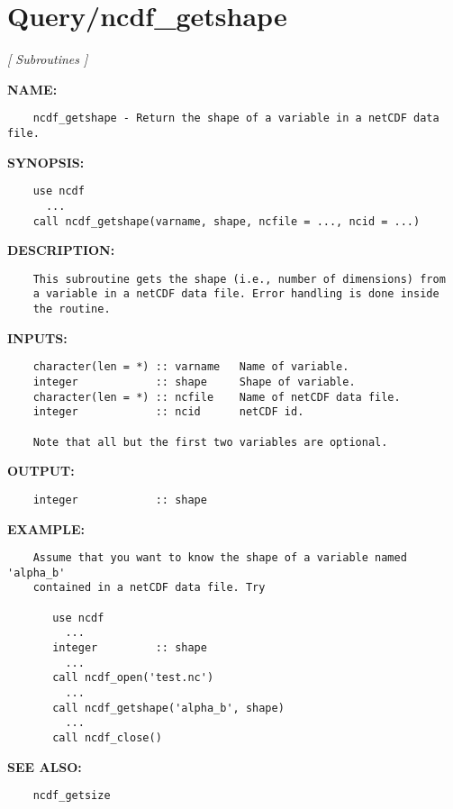 \section{Query/ncdf\_getshape}
\textsl{[ Subroutines ]}

\label{ch:robo93}
\label{ch:Query_ncdf_getshape}
\textbf{NAME:}\hspace{0.08in}\begin{Verbatim}
    ncdf_getshape - Return the shape of a variable in a netCDF data file.
\end{Verbatim}
\textbf{SYNOPSIS:}\hspace{0.08in}\begin{Verbatim}
    use ncdf
      ...
    call ncdf_getshape(varname, shape, ncfile = ..., ncid = ...)
\end{Verbatim}
\textbf{DESCRIPTION:}\hspace{0.08in}\begin{Verbatim}
    This subroutine gets the shape (i.e., number of dimensions) from
    a variable in a netCDF data file. Error handling is done inside
    the routine.
\end{Verbatim}
\textbf{INPUTS:}\hspace{0.08in}\begin{Verbatim}
    character(len = *) :: varname   Name of variable.
    integer            :: shape     Shape of variable.
    character(len = *) :: ncfile    Name of netCDF data file.
    integer            :: ncid      netCDF id.

    Note that all but the first two variables are optional.
\end{Verbatim}
\textbf{OUTPUT:}\hspace{0.08in}\begin{Verbatim}
    integer            :: shape
\end{Verbatim}
\textbf{EXAMPLE:}\hspace{0.08in}\begin{Verbatim}
    Assume that you want to know the shape of a variable named 'alpha_b'
    contained in a netCDF data file. Try

       use ncdf
         ...
       integer         :: shape
         ...
       call ncdf_open('test.nc')
         ...
       call ncdf_getshape('alpha_b', shape)
         ...
       call ncdf_close()
\end{Verbatim}
\textbf{SEE ALSO:}\hspace{0.08in}\begin{Verbatim}
    ncdf_getsize
\end{Verbatim}
